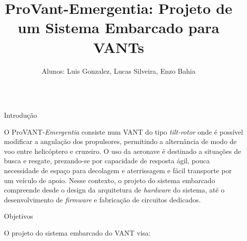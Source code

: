 \documentclass[final,20pt]{beamer}
\title{ProVant-Emergentia: Projeto de um Sistema Embarcado para VANTs}
\author{Alunos: Luis Gonzalez, Lucas Silveira, Enzo Bahia}
\institute[shortinst]{Orientador: Guilherme V. Raffo, Co-Orientador: Richard Andrade}
\newlength{\sepwidth}
\newlength{\colwidth}
\newcommand{\separatorcolumn}{\begin{column}{\sepwidth}\end{column}}
\begin{document}

\begin{frame}[t]
\begin{columns}[t]
\separatorcolumn

\begin{column}{\colwidth}

  \begin{block}{Introdução}

    O ProVANT-\textit{Emergentia} consiste num VANT do tipo \textit{tilt-rotor} onde é possível modificar a angulação dos propulsores, permitindo a alternância de modo de voo entre helicóptero e cruzeiro. O uso da aeronave é  destinado a situações de busca e resgate, prezando-se por capacidade de resposta ágil, pouca necessidade de espaço para decolagem e aterrissagem e fácil transporte por um veículo de apoio. Nesse contexto, o projeto do sistema embarcado compreende desde o design da arquitetura de \textit{hardware} do sistema, até o desenvolvimento de \textit{firmware} e fabricação de circuitos dedicados.


  \end{block}
\vspace{-1em}
  \begin{block}{Objetivos}

    O projeto do sistema embarcado do VANT visa:
   

     

\end{block}
\end{column}
\end{columns}
\end{frame}
\end{document}

